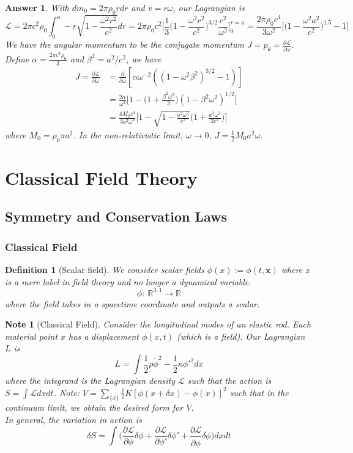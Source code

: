 \documentclass[a4paper]{article}
\newtheorem{ans}{Answer}[section]
\newtheorem{defi}{Definition}[section]
\newtheorem{note}{Note}[section]
\theoremstyle{new}
\begin{document}
\begin{ans}
With $dm_0=2\pi\rho_0rdr$ and $v=r\omega$, our Lagrangian is
$$\mathcal{L}=2\pi c^2\rho_0\int_0^a-r\sqrt{1-\frac{\omega^2r^2}{c^2}}dr=2\pi\rho_0c^2\bigg[\frac{1}{3}\bigg(1-\frac{\omega^2r^2}{c^2}\bigg)^{3/2}\frac{c^2}{\omega^2}\bigg]_0^{r=a}=\frac{2\pi\rho_0c^4}{3\omega^2}\bigg[\bigg(1-\frac{\omega^2a^2}{c^2}\bigg)^{1.5}-1\bigg]$$
We have the angular momentum to be the conjugate momentum $J=p_\theta=\frac{\partial\mathcal{L}}{\partial\omega}$. Define $\alpha=\frac{2\pi c^4\rho_0}{3}$ and $\beta^2=a^2/c^2$, we have
\begin{align}
    J=\frac{\partial\mathcal{L}}{\partial\omega}&=\frac{\partial}{\partial\omega}[\alpha\omega^{-2}((1-\omega^2\beta^2)^{3/2}-1)]\nonumber\\&=\frac{2\alpha}{\omega^3}\bigg[1-\bigg(1+\frac{\beta^2\omega^2}{2}\bigg)(1-\beta^2\omega^2)^{1/2}\bigg]\nonumber\\&=\frac{4M_0c^4}{3a^2\omega^3}\bigg[1-\sqrt{1-\frac{a^2\omega^2}{c^2}}\bigg(1+\frac{a^2\omega^2}{2c^2}\bigg)\bigg]\nonumber
\end{align}
where $M_0=\rho_0\pi a^2$. In the non-relativistic limit, $\omega\rightarrow 0$, $J=\frac{1}{2}M_0a^2\omega$.
\end{ans}
\newpage
\section{Classical Field Theory}
\subsection{Symmetry and Conservation Laws}
\subsubsection{Classical Field}
\begin{defi}[Scalar field]
We consider scalar fields $\phi(x):=\phi(t,\mathbf{x})$ where $x$ is a mere label in field theory and no longer a dynamical variable. 
$$\phi:~\mathbb{R}^{3,1}\rightarrow\mathbb{R}$$
where the field takes in a spacetime coordinate and outputs a scalar.
\end{defi}
\begin{note}[Classical Field]
Consider the longitudinal modes of an elastic rod. Each material point $x$ has a displacement $\phi(x,t)$ (which is a field). Our Lagrangian $L$ is 
$$L=\int\frac{1}{2}\rho\dot{\phi}^2-\frac{1}{2}\kappa\phi'^2dx$$
where the integrand is the Lagrangian density $\mathcal{L}$ such that the action is $S=\int\mathcal{L}dxdt$. Note: $V=\sum_{\{x\}}\frac{1}{2}K[\phi(x+\delta x)-\phi(x)]^2$ such that in the continuum limit, we obtain the desired form for $V$.\\[5pt]
In general, the variation in action is
$$\delta S=\int\bigg(\frac{\partial\mathcal{L}}{\partial\phi}\delta\phi+\frac{\partial\mathcal{L}}{\partial\phi'}\delta\phi'+\frac{\partial\mathcal{L}}{\partial\dot{\phi}}\delta\dot{\phi}\bigg)dxdt$$
\end{note}
\end{document}
